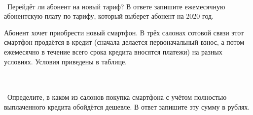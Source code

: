\begin{class}[number=7]
\begin{listofex}
	 	\\\ Перейдёт ли абонент на новый тариф? В ответе запишите ежемесячную абонентскую плату по тарифу, который выберет абонент на 2020 год.
		\item Абонент хочет приобрести новый смартфон. В трёх салонах сотовой связи этот смартфон продаётся в кредит (сначала делается первоначальный взнос, а потом ежемесячно в течение всего срока кредита вносятся платежи) на разных условиях. Условия приведены в таблице.\\\
		\begin{figure}[h]
		\end{figure}
		\\\ Определите, в каком из салонов покупка смартфона с учётом полностью выплаченного кредита обойдётся дешевле. В ответ запишите эту сумму в рублях.
		
	\end{listofex}
\end{class}

